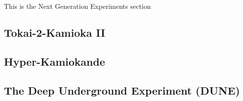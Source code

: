 This is the Next Generation Experiments section
\subsection{Tokai-2-Kamioka II}
\subsection{Hyper-Kamiokande}
\subsection{The Deep Underground Experiment (DUNE)}